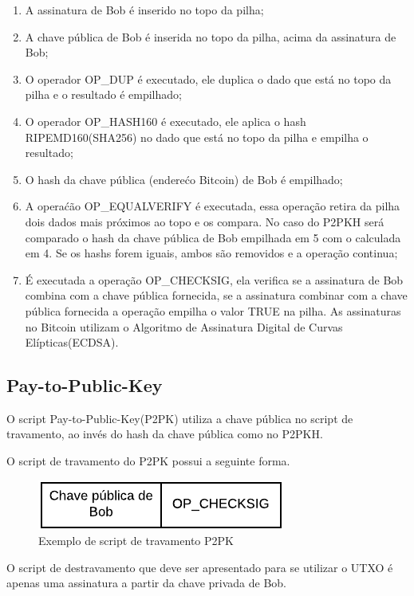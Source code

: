 \documentclass[conference,compsoc]{IEEEtran}
\begin{document}
\begin{enumerate}
\item A assinatura de Bob é inserido no topo da pilha;
\item A chave pública de Bob é inserida no topo da pilha, acima da assinatura de Bob;
\item O operador OP\_DUP é executado, ele duplica o dado que está no topo da pilha e o resultado é empilhado;
\item O operador OP\_HASH160 é executado, ele aplica o hash RIPEMD160(SHA256) no dado que está no topo da pilha e empilha o resultado;
\item O hash da chave pública (enderećo Bitcoin) de Bob é empilhado;
\item A operaćão OP\_EQUALVERIFY é executada, essa operação retira da pilha dois dados mais próximos ao topo e os compara. No caso do P2PKH será comparado o hash da chave pública de Bob empilhada em 5 com o calculada em 4. Se os hashs forem iguais, ambos são removidos e a operação continua;
\item É executada a operação OP\_CHECKSIG, ela verifica se a assinatura de Bob combina com a chave pública fornecida, se a assinatura combinar com a chave pública fornecida a operação empilha o valor TRUE na pilha. As assinaturas no Bitcoin utilizam o Algoritmo de Assinatura Digital de Curvas Elípticas(ECDSA).
\end{enumerate}

\subsection*{Pay-to-Public-Key}
O script Pay-to-Public-Key(P2PK) utiliza a chave pública no script de travamento, ao invés do hash da chave pública como no P2PKH. 

O script de travamento do P2PK possui a seguinte forma.
 
\begin{figure}[H]
    \centering
    \includegraphics[keepaspectratio=true, scale=0.8]{img/P2PK_script_travamento.pdf}
    \caption{Exemplo de script de travamento P2PK}
    \label{fig:P2PK_Travamento}
\end{figure}


O script de destravamento que deve ser apresentado para se utilizar o UTXO é apenas uma assinatura a partir da chave privada de Bob.
\end{document}
